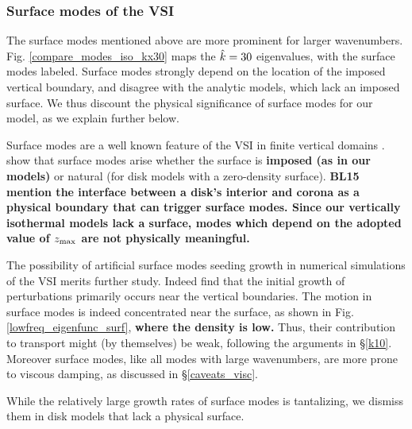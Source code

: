 \subsubsection{Surface modes of the VSI}\label{surf_comment} 
The surface modes mentioned above are more prominent for larger
wavenumbers. Fig. \ref{compare_modes_iso_kx30} maps the $\hat{k} = 30$
eigenvalues, with the surface modes labeled.  Surface modes
strongly depend on the location of the imposed vertical boundary, and
disagree with the analytic models, which lack an imposed surface. We
thus discount the physical significance of surface modes for our
model, as we explain further below.  

Surface modes are a well known feature of the VSI in finite vertical
domains .  show
that surface modes arise whether the surface is {\bf imposed (as in
  our models)} or natural (for disk models with a zero-density surface).
{\bf BL15 mention the interface between a disk's interior and corona
  as a physical boundary that can trigger  surface modes. 
  Since our vertically isothermal models lack a surface, modes which
  depend on the adopted value of $z_\mathrm{max}$ are not physically meaningful.}


The possibility of artificial surface modes seeding growth in
numerical simulations of the VSI  merits further study. Indeed
 find that the initial growth of perturbations
primarily occurs near the vertical boundaries. 
The motion in surface modes is indeed concentrated near the surface,
as shown in Fig. \ref{lowfreq_eigenfunc_surf}, {\bf where the density
  is low.} 
Thus, their contribution to
transport might (by themselves) be weak,  following the arguments in 
\S\ref{k10}.  Moreover surface modes, like all modes with large
wavenumbers, are more prone to viscous damping, as discussed in
\S\ref{caveats_visc}. 

While the relatively large growth rates of surface modes is
tantalizing, we dismiss them in disk models that lack a physical
surface.  

